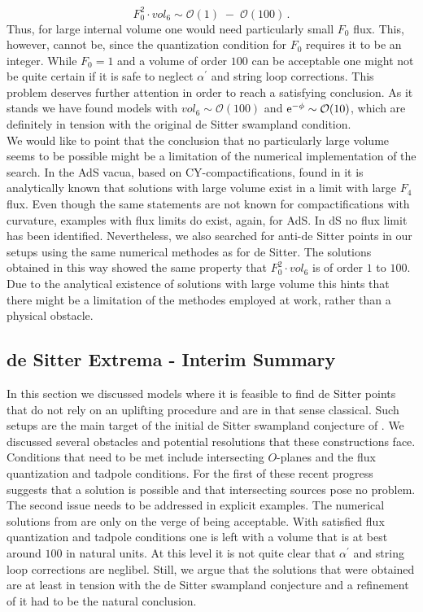 \documentclass[12pt]{report}
\newcommand{\be}{\begin{equation}}
\newcommand{\ee}{\end{equation}}
\def\rme{{\rm e}}
\begin{document}
\be 
F_0^2 \cdot vol_6 \sim \mathcal{O}(1) \; - \; \mathcal{O}(100)\,.
\ee
Thus, for large internal volume one would need particularly small $F_0$ flux. This, however, cannot be, since the quantization condition for $F_0$ requires it to be an integer. While $F_0=1$ and a volume of order $100$ can be acceptable one might not be quite certain if it is safe to neglect $\alpha^ \prime$ and string loop corrections. This problem deserves further attention in order to reach a satisfying conclusion. As it stands we have found models with $vol_6 \sim \mathcal{O}(100)$ and $\rme^ {-\phi} \sim \mathcal{O}(10)$, which are definitely in tension with the original de Sitter swampland condition.\\
We would like to point that the conclusion that no particularly large volume seems to be possible might be a limitation of the numerical implementation of the search. In the AdS vacua, based on CY-compactifications, found in \cite{DeWolfe:2005uu} it is analytically known that solutions with large volume exist in a limit with large $F_4$ flux. Even though the same statements are not known for compactifications with curvature, examples with flux limits do exist, again, for AdS. In dS no flux limit has been identified. Nevertheless, we also searched for anti-de Sitter points in our setups using the same numerical methodes as for de Sitter. The solutions obtained in this way showed the same property that $F_0^ 2 \cdot vol_6$ is of order $1$ to $100$. Due to the analytical existence of solutions with large volume this hints that there might be a limitation of the methodes employed at work, rather than a physical obstacle.

\subsection{de Sitter Extrema - Interim Summary}
In this section we discussed models where it is feasible to find de Sitter points that do not rely on an uplifting procedure and are in that sense classical. Such setups are the main target of the initial de Sitter swampland conjecture of \cite{Obied:2018sgi}. We discussed several obstacles and potential resolutions that these constructions face. Conditions that need to be met include intersecting $O$-planes and the flux quantization and tadpole conditions. For the first of these recent progress \cite{Junghans:2020acz,Marchesano:2020qvg,Cribiori:2021djm} suggests that a solution is possible and that intersecting sources pose no problem. The second issue needs to be addressed in explicit examples. The numerical solutions from \cite{Danielsson:2012et,Roupec:2018mbn} are only on the verge of being acceptable. With satisfied flux quantization and tadpole conditions one is left with a volume that is at best around $100$ in natural units. At this level it is not quite clear that $\alpha^ \prime$ and string loop corrections are neglibel. Still, we argue that the solutions that were obtained are at least in tension with the de Sitter swampland conjecture and a refinement of it had to be the natural conclusion.
\end{document}

